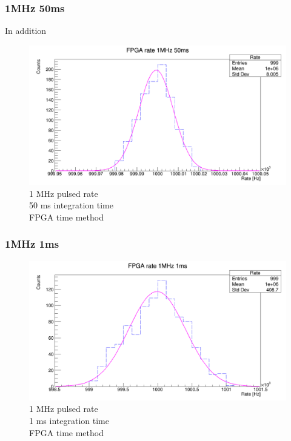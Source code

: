 \subsubsection{1MHz 50ms}
\noindent In addition 
\begin{figure}[H]
	\centering
	\includegraphics[width=0.95\linewidth]{IMG/ch5/RateMeasures/FPGA-time-rate-1MHz-50ms}
	\caption{1 MHz pulsed rate\\50 ms integration time\\FPGA time method}
	\label{fig:FPGA-time-rate-1MHz-50ms}
\end{figure}


\subsubsection{1MHz 1ms}
\begin{figure}[H]
	\centering
	\includegraphics[width=0.95\linewidth]{IMG/ch5/RateMeasures/FPGA-time-rate-1MHz-1ms}
	\caption{1 MHz pulsed rate\\1 ms integration time\\FPGA time method}
	\label{fig:FPGA-time-rate-1MHz-1ms}
\end{figure}











